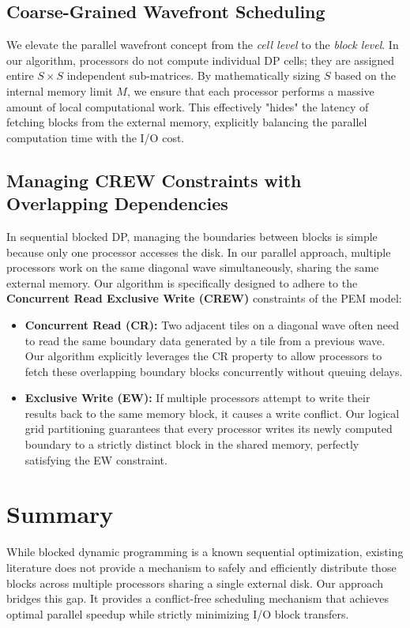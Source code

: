 \subsection{Coarse-Grained Wavefront Scheduling}
We elevate the parallel wavefront concept from the \textit{cell level} to the \textit{block level}. In our algorithm, processors do not compute individual DP cells; they are assigned entire $S \times S$ independent sub-matrices. By mathematically sizing $S$ based on the internal memory limit $M$, we ensure that each processor performs a massive amount of local computational work. This effectively "hides" the latency of fetching blocks from the external memory, explicitly balancing the parallel computation time with the I/O cost.

\subsection{Managing CREW Constraints with Overlapping Dependencies}
In sequential blocked DP, managing the boundaries between blocks is simple because only one processor accesses the disk. In our parallel approach, multiple processors work on the same diagonal wave simultaneously, sharing the same external memory. 
Our algorithm is specifically designed to adhere to the \textbf{Concurrent Read Exclusive Write (CREW)} constraints of the PEM model:
\begin{itemize}
    \item \textbf{Concurrent Read (CR):} Two adjacent tiles on a diagonal wave often need to read the same boundary data generated by a tile from a previous wave. Our algorithm explicitly leverages the CR property to allow processors to fetch these overlapping boundary blocks concurrently without queuing delays.
    \item \textbf{Exclusive Write (EW):} If multiple processors attempt to write their results back to the same memory block, it causes a write conflict. Our logical grid partitioning guarantees that every processor writes its newly computed boundary to a strictly distinct block in the shared memory, perfectly satisfying the EW constraint.
\end{itemize}

\section{Summary}
While blocked dynamic programming is a known sequential optimization, existing literature does not provide a mechanism to safely and efficiently distribute those blocks across multiple processors sharing a single external disk. Our approach bridges this gap. It provides a conflict-free scheduling mechanism that achieves optimal parallel speedup while strictly minimizing I/O block transfers.

